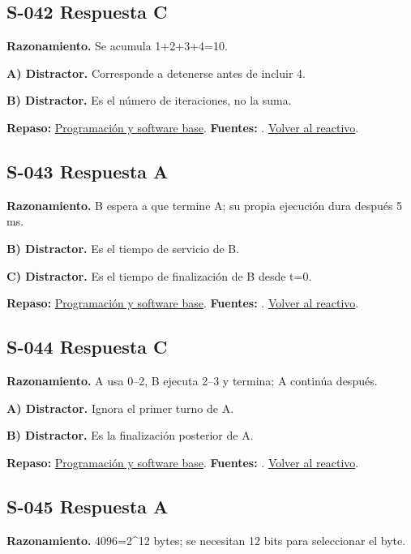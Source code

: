 \subsection*{S-042 \quad Respuesta C}\label{s:S-042}
\textbf{Razonamiento.} Se acumula 1+2+3+4=10.

\textbf{A) Distractor. }Corresponde a detenerse antes de incluir 4.

\textbf{B) Distractor. }Es el número de iteraciones, no la suma.

\textbf{Repaso:} \hyperref[sec:s2]{Programación y software base}. \textbf{Fuentes:} \cite{ostep,cppreference,compiler}. \hyperref[q:S-042]{Volver al reactivo}.\par\medskip

\subsection*{S-043 \quad Respuesta A}\label{s:S-043}
\textbf{Razonamiento.} B espera a que termine A; su propia ejecución dura después 5 ms.

\textbf{B) Distractor. }Es el tiempo de servicio de B.

\textbf{C) Distractor. }Es el tiempo de finalización de B desde t=0.

\textbf{Repaso:} \hyperref[sec:s2]{Programación y software base}. \textbf{Fuentes:} \cite{ostep,cppreference,compiler}. \hyperref[q:S-043]{Volver al reactivo}.\par\medskip

\subsection*{S-044 \quad Respuesta C}\label{s:S-044}
\textbf{Razonamiento.} A usa 0–2, B ejecuta 2–3 y termina; A continúa después.

\textbf{A) Distractor. }Ignora el primer turno de A.

\textbf{B) Distractor. }Es la finalización posterior de A.

\textbf{Repaso:} \hyperref[sec:s2]{Programación y software base}. \textbf{Fuentes:} \cite{ostep,cppreference,compiler}. \hyperref[q:S-044]{Volver al reactivo}.\par\medskip

\subsection*{S-045 \quad Respuesta A}\label{s:S-045}
\textbf{Razonamiento.} 4096=2\textasciicircum{}12 bytes; se necesitan 12 bits para seleccionar el byte.

